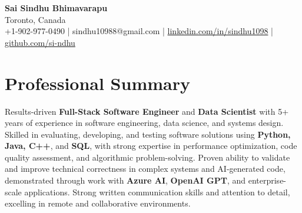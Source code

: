 \documentclass[letterpaper,11pt]{article}
\begin{document}
\begin{center}
  {\Large \textbf{Sai Sindhu Bhimavarapu}} \\
  Toronto, Canada \\
  +1-902-977-0490 \enspace | \enspace sindhu10988@gmail.com \enspace | \enspace \href{https://www.linkedin.com/in/sindhu1098/}{linkedin.com/in/sindhu1098} \enspace | \enspace \href{https://github.com/si-ndhu}{github.com/si-ndhu}
\end{center}

\section{Professional Summary}
  \begin{itemize}[leftmargin=0.15in, label={}]
    \small{\item{
     Results-driven \textbf{Full-Stack Software Engineer} and \textbf{Data Scientist} with 5+ years of experience in software engineering, data science, and systems design. Skilled in evaluating, developing, and testing software solutions using \textbf{Python, Java, C++}, and \textbf{SQL}, with strong expertise in performance optimization, code quality assessment, and algorithmic problem-solving. Proven ability to validate and improve technical correctness in complex systems and AI-generated code, demonstrated through work with \textbf{Azure AI}, \textbf{OpenAI GPT}, and enterprise-scale applications. Strong written communication skills and attention to detail, excelling in remote and collaborative environments.
    }}
  \end{itemize}
\vspace{-16pt}

\end{document}
